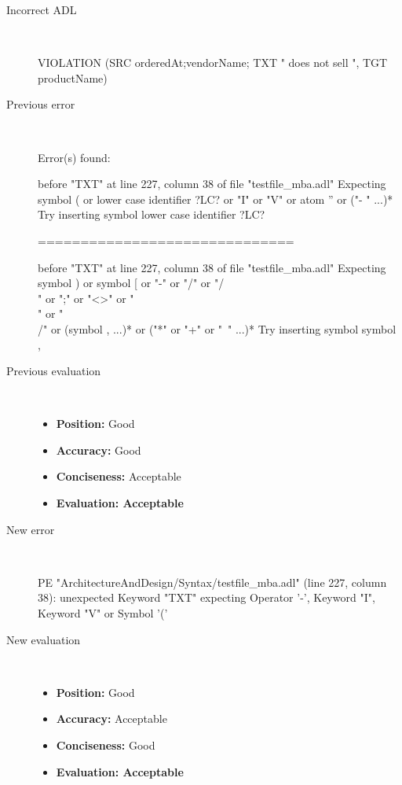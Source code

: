 \hrulefill

\begin{description}
  \item[Incorrect ADL]~\\
\begin{adl}
VIOLATION (SRC orderedAt;vendorName; TXT " does not sell ", TGT productName)\end{adl}
  \item[Previous error]~\\
\begin{haskell}
Error(s) found:

before "TXT" at line 227, column 38 of file "testfile_mba.adl"
Expecting symbol ( or lower case identifier ?LC? or "I" or "V" or atom '' or ("-
" ...)*
Try inserting symbol lower case identifier ?LC?

==============================

before "TXT" at line 227, column 38 of file "testfile_mba.adl"
Expecting symbol ) or symbol [ or "-" or "/" or "/\\" or ";" or "<>" or "\\" or
"\\/" or (symbol , ...)* or ("*" or "+" or "~" ...)*
Try inserting symbol symbol ,
\end{haskell}
  \item[Previous evaluation]~\\
    \begin{itemize}
    \item \textbf{Position:} Good
    \item \textbf{Accuracy:} Good
    \item \textbf{Conciseness:} Acceptable
    \item \textbf{Evaluation: Acceptable}
    \end{itemize}
  \item[New error]~\\
\begin{haskell}
PE "ArchitectureAndDesign/Syntax/testfile_mba.adl" (line 227, column 38):
unexpected Keyword "TXT"
expecting Operator '-', Keyword "I", Keyword "V" or Symbol '('\end{haskell}
  \item[New evaluation]~\\
    \begin{itemize}
    \item \textbf{Position:} Good
    \item \textbf{Accuracy:} Acceptable
    \item \textbf{Conciseness:} Good
    \item \textbf{Evaluation: Acceptable}
    \end{itemize}
  \end{description}

